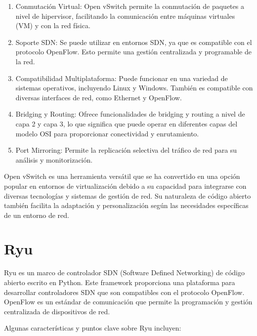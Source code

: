 \documentclass[a4paper, 12pt]{book}
\begin{document}
	\begin{enumerate}
		\item Conmutación Virtual: Open vSwitch permite la conmutación de paquetes a nivel de hipervisor, facilitando la comunicación entre máquinas virtuales (VM) y con la red física.
	
	
		\item Soporte SDN: Se puede utilizar en entornos SDN, ya que es compatible con el protocolo OpenFlow. Esto permite una gestión centralizada y programable de la red.
	
		\item Compatibilidad Multiplataforma: Puede funcionar en una variedad de sistemas operativos, incluyendo Linux y Windows. También es compatible con diversas interfaces de red, como Ethernet y OpenFlow.
	
		\item Bridging y Routing: Ofrece funcionalidades de bridging y routing a nivel de capa 2 y capa 3, lo que significa que puede operar en diferentes capas del modelo OSI para proporcionar conectividad y enrutamiento.
	
		\item Port Mirroring: Permite la replicación selectiva del tráfico de red para su análisis y monitorización.
	
	\end{enumerate}
	
	Open vSwitch es una herramienta versátil que se ha convertido en una opción popular en entornos de virtualización debido a su capacidad para integrarse con diversas tecnologías y sistemas de gestión de red. Su naturaleza de código abierto también facilita la adaptación y personalización según las necesidades específicas de un entorno de red.
	
	\section{Ryu} 
	\label{sec:ryu}
	
	
	Ryu es un marco de controlador SDN (Software Defined Networking) de código abierto escrito en Python. Este framework proporciona una plataforma para desarrollar controladores SDN que son compatibles con el protocolo OpenFlow. OpenFlow es un estándar de comunicación que permite la programación y gestión centralizada de dispositivos de red.
	
	Algunas características y puntos clave sobre Ryu incluyen:
	
\end{document}
